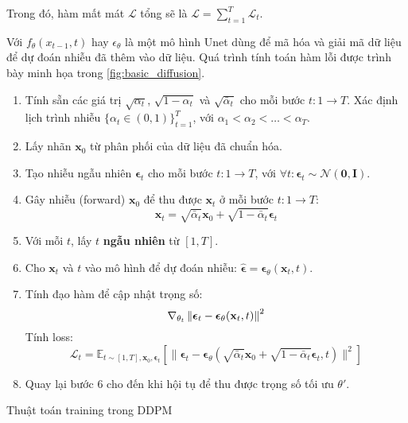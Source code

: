 Trong đó, hàm mất mát $\mathcal{L}$ tổng sẽ là  $\mathcal{L} = \sum_{t=1}^{T} \mathcal{L}_t$.

Với $f_{\theta}(x_{t-1}, t)$ hay $\epsilon_\theta$ là một mô hình Unet dùng để mã hóa và giải mã dữ liệu để dự đoán nhiễu đã thêm vào dữ liệu. Quá trình tính toán hàm lỗi được trình bày minh họa trong \autoref{fig:basic_diffusion}.


\begin{algorithm}[H]
	
	\setlength{\baselineskip}{10pt}
	\begin{enumerate}
		\vspace{5pt}
		\item Tính sẵn các giá trị $\sqrt{\alpha_t}$, $\sqrt{1 - \alpha_t}$ và $\sqrt{\bar{\alpha}_t}$ cho mỗi bước $t: 1 \rightarrow T$. Xác định lịch trình nhiễu $\{\alpha_t \in (0, 1)\}_{t=1}^T$, với $\alpha_1 < \alpha_2 < \dots < \alpha_T$.
		
		\item Lấy nhãn $\mathbf{x}_0$ từ phân phối của dữ liệu đã chuẩn hóa.
		
		\item Tạo nhiễu ngẫu nhiên $\boldsymbol{\epsilon}_t$ cho mỗi bước $t: 1 \rightarrow T$, với $\forall t: \boldsymbol{\epsilon}_t \sim \mathcal{N}(\mathbf{0}, \mathbf{I})$.
		
		\item Gây nhiễu (forward) $\mathbf{x}_0$ để thu được $\mathbf{x}_t$ ở mỗi bước $t: 1 \rightarrow T$:
		$$
		\mathbf{x}_t = \sqrt{\bar{\alpha}_t} \mathbf{x}_0 + \sqrt{1 - \bar{\alpha}_t} \boldsymbol{\epsilon}_t
		$$
		
		\item Với mỗi $t$, lấy $t$ \textbf{ngẫu nhiên} từ $[1, T]$.
		
		\item Cho $\mathbf{x}_t$ và $t$ vào mô hình để dự đoán nhiễu: $\hat{\boldsymbol{\epsilon}} = \boldsymbol{\epsilon}_\theta(\mathbf{x}_t, t)$.
		
		\item Tính đạo hàm để cập nhật trọng số:
		$$
		\nabla_{\theta_t} \left\| \boldsymbol{\epsilon}_t - \boldsymbol{\epsilon}_\theta(\mathbf{x}_t, t) \right\|^2
		$$
		Tính loss:
		$$
		\mathcal{L}_t = \mathbb{E}_{t \sim [1, T], \mathbf{x}_0, \boldsymbol{\epsilon}_t} \left[ \|\boldsymbol{\epsilon}_t - \boldsymbol{\epsilon}_\theta(\sqrt{\bar{\alpha}_t} \mathbf{x}_0 + \sqrt{1 - \bar{\alpha}_t} \boldsymbol{\epsilon}_t, t)\|^2 \right]
		$$
		
		\item Quay lại bước 6 cho đến khi hội tụ để thu được trọng số tối ưu $\theta'$.
	\end{enumerate}
	\caption{Thuật toán training trong DDPM}
	\label{alg:TrainingDDPM}
\end{algorithm}


